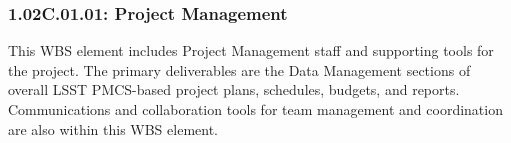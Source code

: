 \subsubsection*{1.02C.01.01: Project Management}

This WBS element includes Project Management staff and supporting tools for
the project. The primary deliverables are the Data Management sections of
overall LSST PMCS-based project plans, schedules, budgets, and reports.
Communications and collaboration tools for team management and coordination are
also within this WBS element.
